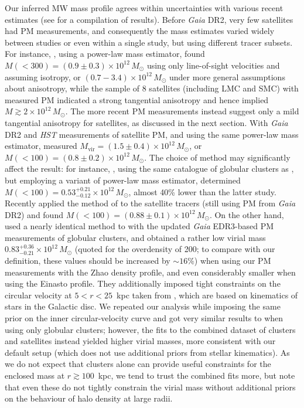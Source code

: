 \documentclass[usenatbib,fleqn]{mnras}
\newcommand{\Gaia}{\textit{Gaia}\xspace}
\begin{document}
Our inferred MW mass profile agrees within uncertainties with various recent estimates (see \citealt{Wang2020} for a compilation of results). 
Before \Gaia DR2, very few satellites had PM measurements, and consequently the mass estimates varied widely between studies or even within a single study, but using different tracer subsets. For instance, \citet{Watkins2010}, using a power-law mass estimator, found $M(<300) = (0.9\pm 0.3) \times 10^{12}\,M_\odot$ using only line-of-sight velocities and assuming isotropy, or $(0.7-3.4) \times 10^{12}\,M_\odot$ under more general assumptions about anisotropy, while  the sample of 8 satellites (including LMC and SMC) with measured PM indicated a strong tangential anisotropy and hence implied $M\gtrsim 2 \times 10^{12}\,M_\odot$. The more recent PM measurements instead suggest only a mild tangential anisotropy for satellites, as discussed in the next section. With \Gaia DR2 and \textit{HST} measurements of satellite PM, and using the same power-law mass estimator, \citet{Fritz2020} measured $M_\text{vir}=(1.5\pm0.4) \times 10^{12}\,M_\odot$, or $M(<100)=(0.8\pm0.2) \times 10^{12}\,M_\odot$. The choice of method may significantly affect the result: for instance, \citet{Eadie2019}, using the same catalogue of globular clusters as \citet{Vasiliev2019b}, but employing a variant of power-law mass estimator, determined $M(<100)=0.53^{+0.21}_{-0.12}\times10^{12}\,M_\odot$, almost 40\% lower than the latter study. Recently \citet{Slizewski2021} applied the method of \citet{Eadie2019} to the satellite tracers (still using PM from \Gaia DR2) and found $M(<100)=(0.88\pm0.1)\times10^{12}\,M_\odot$. On the other hand, \citet{Wang2021} used a nearly identical method to \citet{Vasiliev2019b} with the updated \Gaia EDR3-based PM measurements of globular clusters, and obtained a rather low virial mass $0.83^{+0.36}_{-0.21}\times10^{12}\,M_\odot$ (quoted for the overdensity of 200; to compare with our definition, these values should be increased by $\sim 16\%$) when using our PM measurements with the Zhao density profile, and even considerably smaller when using the Einasto profile. They additionally imposed tight constraints on the circular velocity at $5<r<25$~kpc taken from \citet{Eilers2019}, which are based on kinematics of stars in the Galactic disc. We repeated our analysis while imposing the same prior on the inner circular-velocity curve and got very similar results to \citet{Wang2021} when using only globular clusters; however, the fits to the combined dataset of clusters and satellites instead yielded higher virial masses, more consistent with our default setup (which does not use additional priors from stellar kinematics). As we do not expect that clusters alone can provide useful constraints for the enclosed mass at $r\gtrsim 100$~kpc, we tend to trust the combined fits more, but note that even these do not tightly constrain the virial mass without additional priors on the behaviour of halo density at large radii.
\end{document}
